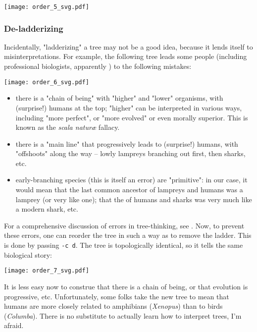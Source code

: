 
\begin{center}
\texttt{[image: order\_5\_svg.pdf]}
\end{center}

\subsubsection{De-ladderizing}

Incidentally, "ladderizing" a tree may not be a good idea, because it lends
itself to misinterpretations. For example, the following tree leads some people
(including professional biologists, apparently \cite{Baum_2005}) to the
following mistakes:

\begin{center}
\texttt{[image: order\_6\_svg.pdf]}
\end{center}
\begin{itemize}
	\item there is a "chain of being" with "higher" and "lower" organisms,
	with (surprise!) humans at the top; "higher" can be interpreted in
	various ways, including "more perfect", or "more evolved" or even
	morally superior. This is known as the \textit{scala natur\ae} fallacy.
	\item there is a "main line" that progressively leads to (surprise!)
	humans, with "offshoots" along the way -- lowly lampreys branching out
	first, then sharks, etc. 
	\item early-branching species (this is itself an error) are
	"primitive": in our case, it would mean that the last common ancestor
	of lampreys and humans was a lamprey (or very like one); that the
	\lca{} of humans and sharks was
	very much like a modern shark, etc.
\end{itemize}
For a comprehensive discussion of errors in tree-thinking, see
\cite{Gregory_2008}.  Now, to prevent these errors, one can reorder the tree in
such a way as to remove the ladder. This is done by passing \texttt{-c d}. The
tree is topologically identical, so it tells the same biological story:


\begin{center}
\texttt{[image: order\_7\_svg.pdf]}
\end{center}

\noindent{}It is less easy now to construe that there is a chain of being, or
that evolution is progressive, etc. Unfortunately, some folks take the new tree
to mean that humans are more closely related to amphibians (\textit{Xenopus})
than to birds (\textit{Columba}). There is no substitute to actually learn how
to interpret trees, I'm afraid. 
